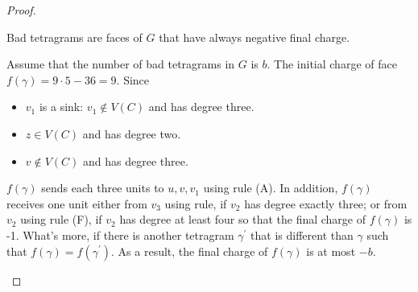 \begin{proof}
\begin{itemize}
\begin{itemize}
        \begin{observation}
        Bad tetragrams are faces of $G$ that have always negative final charge. \cite{dvorak2013threecoloring}
        \end{observation}
        Assume that the number of bad tetragrams in $G$ is $b$. The initial charge of face $f(\gamma) = 9 \cdot 5 - 36 = 9$. Since 
        \begin{itemize}
            \item $v_1$ is a sink: $v_1 \notin V(C)$ and has degree three.
            \item $z \in V(C)$ and has degree two.
            \item $v \notin V(C)$ and has degree three. 
        \end{itemize}
        $f(\gamma)$ sends each three units to $u, v, v_1$ using rule (A). In addition, $f(\gamma)$ receives one unit either from $v_3$ using rule, if $v_2$ has degree exactly three; or from $v_2$ using rule (F), if $v_2$ has degree at least four so that the final charge of $f(\gamma)$ is -1. What's more, if there is another tetragram $\gamma^{'}$ that is different than $\gamma$ such that $f(\gamma) = f(\gamma^{'})$. As a result, the final charge of $f(\gamma)$ is at most $-b$.
        

\end{itemize}
\end{itemize}
\end{proof}
